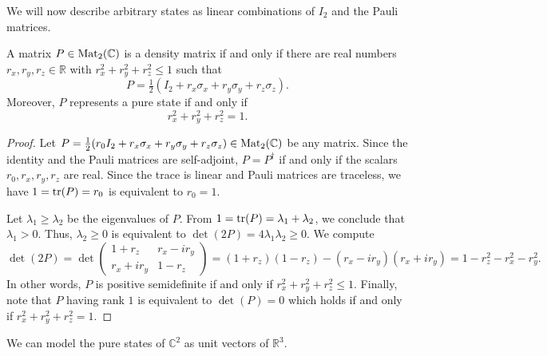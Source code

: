 \documentclass[a4paper, oneside, 12pt]{amsart}
\begin{document}
We will now describe arbitrary states as linear combinations of \(I_{2}\) and the Pauli matrices.

\begin{theorem}\label{thm:characterising-the-qubit}
  A matrix \(P \in \operatorname{Mat}_{2}( \mathbb{C})\) is a density matrix  if and only if there are real numbers \(r_{x}, r_{y}, r_{z}\in \mathbb{R}\) with \(r_{x}^{2}+ r_{y}^{2}+r_{z}^{2} \leq 1\) such that
  \begin{equation}
    P = \tfrac{1}{2}(I_{2} +r_{x}\sigma_{x} + r_{y}\sigma_{y}+ r_{z}\sigma_{z}).
  \end{equation}
  Moreover, \(P\) represents a pure state if and only if
  \begin{equation}
    r_{x}^{2}+ r_{y}^{2}+r_{z}^{2} = 1.
  \end{equation}
\end{theorem}
\begin{proof}
  Let \(P=\tfrac{1}{2}(r_{0}I_{2} +r_{x}\sigma_{x} + r_{y}\sigma_{y}+ r_{z}\sigma_{z})\in \operatorname{Mat}_{2}( \mathbb{C})\) be any matrix.
  Since the identity and the Pauli matrices are self-adjoint, \(P = P^{\dagger}\) if and only if the scalars \(r_{0}, r_{x}, r_{y}, r_{z}\) are real.
  Since the trace is linear and Pauli matrices are traceless, we have \(1 = \operatorname{tr}(P) = r_{0}\) is equivalent to \(r_{0} = 1\).

  Let \(\lambda_{1} \geq \lambda_{2}\) be the eigenvalues of \(P\).
  From \(1=\operatorname{tr}(P) = \lambda_{1}+ \lambda_{2}\), we conclude that \(\lambda_{1}> 0\).
  Thus, \(\lambda_{2} \geq 0 \) is equivalent to \(\det(2P) = 4\lambda_{1}\lambda_{2} \geq 0\).
  We compute
  \begin{equation*}
    \det (2 P)
    =\det
    \begin{pmatrix}
      1 + r_{z} & r_{x} - i r_{y} \\
      r_{x} + i r_{y} & 1- r_{z}
    \end{pmatrix}
    = (1+r_{z})(1- r_{z}) - (r_{x} -i r_{y})(r_{x} + i r_{y})
    = 1 -r_{z}^{2} - r_{x}^{2} - r_{y}^{2}.
  \end{equation*}
  In other words, \(P\) is positive semidefinite if and only if \(r_{x}^{2} + r_{y}^{2} + r_{z}^{2} \leq 1\).
  Finally, note that \(P\) having rank \(1\) is equivalent to \(\det(P) = 0\) which holds if and only if \(r_{x}^{2} + r_{y}^{2} + r_{z}^{2} = 1\).
\end{proof}

We can model the pure states of \( \mathbb{C}^{2}\) as unit vectors of \( \mathbb{R}^{3}\).
\end{document}

